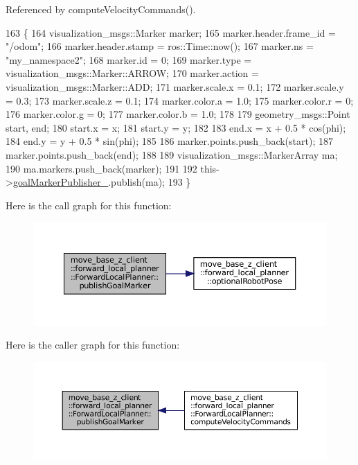 Referenced by compute\+Velocity\+Commands().


\begin{DoxyCode}
163 \{
164     visualization\_msgs::Marker marker;
165     marker.header.frame\_id = \textcolor{stringliteral}{"/odom"};
166     marker.header.stamp = ros::Time::now();
167     marker.ns = \textcolor{stringliteral}{"my\_namespace2"};
168     marker.id = 0;
169     marker.type = visualization\_msgs::Marker::ARROW;
170     marker.action = visualization\_msgs::Marker::ADD;
171     marker.scale.x = 0.1;
172     marker.scale.y = 0.3;
173     marker.scale.z = 0.1;
174     marker.color.a = 1.0;
175     marker.color.r = 0;
176     marker.color.g = 0;
177     marker.color.b = 1.0;
178 
179     geometry\_msgs::Point start, end;
180     start.x = x;
181     start.y = y;
182 
183     end.x = x + 0.5 * cos(phi);
184     end.y = y + 0.5 * sin(phi);
185 
186     marker.points.push\_back(start);
187     marker.points.push\_back(end);
188 
189     visualization\_msgs::MarkerArray ma;
190     ma.markers.push\_back(marker);
191 
192     this->\hyperlink{classmove__base__z__client_1_1forward__local__planner_1_1ForwardLocalPlanner_a014eb2e6f1a7d9eeb3599c941a1bf1ee}{goalMarkerPublisher\_}.publish(ma);
193 \}
\end{DoxyCode}
Here is the call graph for this function\+:
\nopagebreak
\begin{figure}[H]
\begin{center}
\leavevmode
\includegraphics[width=350pt]{classmove__base__z__client_1_1forward__local__planner_1_1ForwardLocalPlanner_a75346bffc10020b4b2af26835039990a_cgraph}
\end{center}
\end{figure}
Here is the caller graph for this function\+:
\nopagebreak
\begin{figure}[H]
\begin{center}
\leavevmode
\includegraphics[width=350pt]{classmove__base__z__client_1_1forward__local__planner_1_1ForwardLocalPlanner_a75346bffc10020b4b2af26835039990a_icgraph}
\end{center}
\end{figure}

